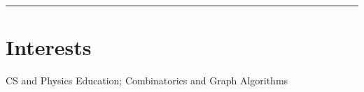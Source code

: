 \documentclass[11pt]{article}
\begin{document}
\rule{\textwidth}{0.1pt}
\vspace*{-10mm}

\section*{Interests}
\vspace*{-1mm}

CS and Physics Education;
Combinatorics and Graph Algorithms
\end{document}
